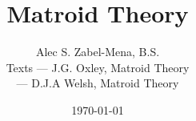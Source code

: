 \documentclass[12pt, twoside]{book}
\title{Matroid Theory}
\author{
  Alec S. Zabel-Mena, B.S. \\
  Texts --- J.G. Oxley, Matroid Theory \cite{oxley2011} \\
        --- D.J.A Welsh, Matroid Theory \cite{welsh2010}
}
\date{\today}
\begin{document}
\maketitle
\tableofcontents



\nocite{*}



\end{document}
